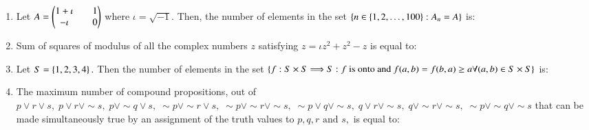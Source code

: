 \documentclass[journal]{IEEEtran}
\theoremstyle{remark}
\begin{document}
\begin{enumerate}
\item  Let $A = \begin{pmatrix}1+\iota && 1\\-\iota &&0\end{pmatrix} $ where $\iota=\sqrt{-1}.$ Then, the number of elements in the set $ \left\{n \in \{1, 2, \ldots, 100\} : A_n = A\right\} $  is:\\

\item Sum of squares of modulus of all the complex numbers $z$ satisfying ${z} = \iota z^2 + z^2 - z$ is equal to:\\

\item Let $S = \left\{1, 2, 3, 4\right\}.$ Then the number of elements in the set $\left\{f : S \times S \Longrightarrow S : f \text{ is onto and }f(a,b)=f(b,a) \geq a \forall (a, b)\in  S \times S\right\}$ is:\\

\item  The maximum number of compound propositions, out of $p \lor r \lor s, \; p \lor r \lor \sim s, \; p \lor \sim q \lor s, \; \sim p \lor \sim r \lor s, \; \sim p \lor \sim r \lor \sim s, \; \sim p \lor q \lor \sim s, \; q \lor r \lor \sim s, \; q \lor \sim r \lor \sim s, \; \sim p \lor \sim q \lor \sim s$ that can be made simultaneously true by an assignment of the truth values to $p, q, r \text{ and } s,$ is equal to:


\end{enumerate}
\end{document}
